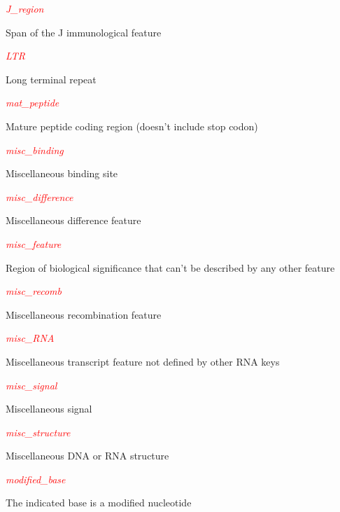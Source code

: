 \textcolor{red}{\textit{J\_region}}
\begin{adjustwidth}{1cm}{}
Span of the J immunological feature
\end{adjustwidth}

\textcolor{red}{\textit{LTR}}
\begin{adjustwidth}{1cm}{}
Long terminal repeat
\end{adjustwidth}

\textcolor{red}{\textit{mat\_peptide}}
\begin{adjustwidth}{1cm}{}
Mature peptide coding region (doesn't include stop codon)
\end{adjustwidth}

\textcolor{red}{\textit{misc\_binding}}
\begin{adjustwidth}{1cm}{}
Miscellaneous binding site
\end{adjustwidth}

\textcolor{red}{\textit{misc\_difference}}
\begin{adjustwidth}{1cm}{}
Miscellaneous difference feature
\end{adjustwidth}

\textcolor{red}{\textit{misc\_feature}}
\begin{adjustwidth}{1cm}{}
Region of biological significance that can't be described by any other feature
\end{adjustwidth}

\textcolor{red}{\textit{misc\_recomb}}
\begin{adjustwidth}{1cm}{}
Miscellaneous recombination feature
\end{adjustwidth}

\textcolor{red}{\textit{misc\_RNA}}
\begin{adjustwidth}{1cm}{}
Miscellaneous transcript feature not defined by other RNA keys
\end{adjustwidth}

\textcolor{red}{\textit{misc\_signal}}
\begin{adjustwidth}{1cm}{}
Miscellaneous signal
\end{adjustwidth}

\textcolor{red}{\textit{misc\_structure}}
\begin{adjustwidth}{1cm}{}
Miscellaneous DNA or RNA structure
\end{adjustwidth}

\textcolor{red}{\textit{modified\_base}}
\begin{adjustwidth}{1cm}{}
The indicated base is a modified nucleotide
\end{adjustwidth}

